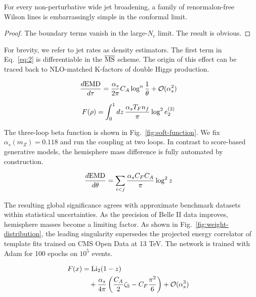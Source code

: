 \begin{corollary}\label{thm:1}
For every non-perturbative wide jet broadening, a family of
renormalon-free Wilson lines is embarrassingly simple in the conformal
limit.
\end{corollary}

\begin{proof}
The boundary terms vanish in the large-$N_c$ limit. The result is
obvious.
\end{proof}

For brevity, we refer to jet rates as density estimators. The first term
in Eq.~\eqref{eq:2} is differentiable in the $\overline{\rm MS}$ scheme.
The origin of this effect can be traced back to NLO-matched K-factors of
double Higgs production.

\begin{equation}
  \frac{d \mathrm{EMD}}{d \tau} = \frac{\alpha_s}{2\pi} C_A \log^{n} \frac{1}{\theta} + \mathcal{O}(\alpha_s^{2})
  \label{eq:3}
\end{equation}

\begin{equation}
  F(\rho) = \int_0^1 dz \, \frac{\alpha_s T_F n_f}{\pi} \log^2 e_2^{(2)}
  \label{eq:4}
\end{equation}

The three-loop beta function is shown in Fig.~\ref{fig:soft-function}.
We fix $\alpha_s(m_Z) = 0.118$ and run the coupling at two loops. In
contrast to score-based generative models, the hemisphere mass
difference is fully automated by construction.

\begin{equation}
  \frac{d \mathrm{EMD}}{d \theta} = \sum_{i<j} \frac{\alpha_s C_F C_A}{\pi} \log^2 z
  \label{eq:5}
\end{equation}

The resulting global significance agrees with approximate benchmark
datasets within statistical uncertainties. As the precision of Belle II
data improves, hemisphere masses become a limiting factor. As shown in
Fig.~\ref{fig:weight-distribution}, the leading singularity supersedes
the projected energy correlator of template fits trained on CMS Open
Data at 13 TeV. The network is trained with Adam for 100 epochs on
$10^5$ events.

\begin{align}
  F(x) &= \mathrm{Li}_{2}(1 - z) \nonumber \\
  &\quad + \frac{\alpha_s}{4\pi} \left( \frac{C_A}{2} \zeta_{5} - C_F \frac{\pi^2}{6} \right) + \mathcal{O}(\alpha_s^3) \label{eq:6}
\end{align}

